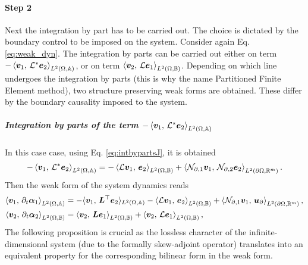 \paragraph{Step 2} Next the integration by part has to be carried out. The choice is dictated by the boundary control to be imposed on the system. Consider again Eq. \eqref{eq:weak_dyn}. The integration by parts can be carried out either on term $-\inner[L^2(\Omega, \mathbb{A})]{\bm{v}_1}{\mathcal{L}^*\bm{e}_2}$, or on term $\inner[L^2(\Omega, \mathbb{B})]{\bm{v}_2}{\mathcal{L}\bm{e}_1}$. Depending on which line undergoes the integration by parts (this is why the name Partitioned Finite Element method), two structure preserving weak forms are obtained. These differ by the boundary causality imposed to the system. 


\subparagraph{Integration by parts of the term $-\inner[L^2(\Omega, \mathbb{A})]{\bm{v}_1}{\mathcal{L}^*\bm{e}_2}$}
In this case case, using Eq. \eqref{eq:intbypartsJ}, it is obtained 
\begin{equation}
-\inner[L^2(\Omega, \mathbb{A})]{\bm{v}_1}{\mathcal{L}^*\bm{e}_2} = -\inner[L^2(\Omega, \mathbb{B})]{\mathcal{L}\bm{v}_1}{\bm{e}_2} + \inner[L^2(\partial \Omega, \mathbb{R}^m)]{\mathcal{N}_{\partial, 1} \bm{v}_1}{\mathcal{N}_{\partial, 2} \bm{e}_2}.
\end{equation}
Then the weak form of the system dynamics  reads 
\begin{equation}\label{eq:weak_dyn_intJ1}
\begin{aligned}
\inner[L^2(\Omega, \mathbb{A})]{\bm{v}_1}{\partial_t \bm{\alpha}_1} &=   -  \langle{\bm{v}_1}, \,{\bm{L}^\top \bm{e}_2}\rangle_{L^2(\Omega, \mathbb{A})}  -\inner[L^2(\Omega, \mathbb{B})]{\mathcal{L}\bm{v}_1}{\bm{e}_2} + \inner[L^2(\partial \Omega, \mathbb{R}^m)]{\mathcal{N}_{\partial, 1} \bm{v}_1}{\bm{u}_\partial}, \\
\inner[L^2(\Omega, \mathbb{B})]{\bm{v}_2}{\partial_t \bm{\alpha}_2} &=   \inner[L^2(\Omega, \mathbb{B})]{\bm{v}_2}{\bm{L}\bm{e}_1} + \inner[L^2(\Omega, \mathbb{B})]{\bm{v}_2}{\mathcal{L}\bm{e}_1},
\end{aligned}
\end{equation}
The following proposition is crucial as the lossless character of the infinite-dimensional system (due to the formally skew-adjoint operator) translates into an equivalent property for the corresponding bilinear form in the weak form.
